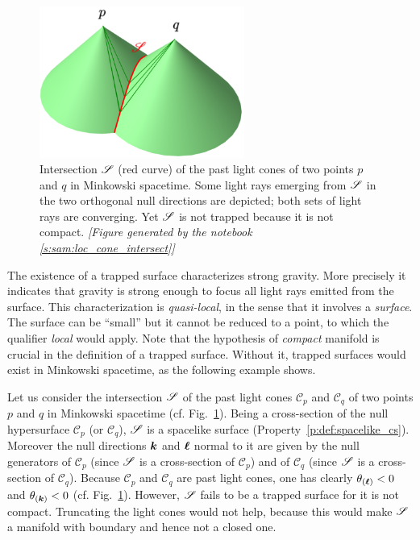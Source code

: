 \begin{figure}
\centerline{\includegraphics[width=0.6\textwidth]{loc_cone_intersect.png}}
\caption[]{\label{f:loc:cone_intersect} \footnotesize
Intersection $\mathscr{S}$ (red curve) of the past light cones of two points $p$ and $q$ in Minkowski spacetime.
Some light rays emerging from $\mathscr{S}$ in the two orthogonal null directions are depicted; both sets
of light rays are converging. Yet $\mathscr{S}$ is not trapped because it is not compact.
\textsl{[Figure generated by the notebook \ref{s:sam:loc_cone_intersect}]}
}
\end{figure}

The existence of a trapped surface characterizes
strong gravity. More precisely it indicates that gravity is strong enough
to focus all light rays emitted from the surface.
This characterization is \emph{quasi-local}, in the sense that it involves a \emph{surface}. The
surface can be ``small'' but it cannot be reduced to a point, to which the qualifier \emph{local}
would apply. Note that the hypothesis of \emph{compact} manifold is crucial in the definition of a
trapped surface. Without it, trapped surfaces would exist in Minkowski
spacetime, as the following example shows.

\begin{example}
Let us consider the intersection $\mathscr{S}$ of the past light cones $\mathscr{C}_p$ and $\mathscr{C}_q$
of two points $p$ and $q$ in Minkowski spacetime (cf. Fig.~\ref{f:loc:cone_intersect}).
Being a cross-section of the null hypersurface $\mathscr{C}_p$ (or $\mathscr{C}_q$),
$\mathscr{S}$ is a spacelike surface (Property~\ref{p:def:spacelike_cs}).
Moreover the null directions $\bm{k}$ and $\bm{\ell}$ normal to it are given by the null generators of
$\mathscr{C}_p$ (since $\mathscr{S}$ is a cross-section of $\mathscr{C}_p$)
and of $\mathscr{C}_q$ (since $\mathscr{S}$ is a cross-section of $\mathscr{C}_q$).
Because $\mathscr{C}_p$ and $\mathscr{C}_q$ are past light cones, one has clearly
$\theta_{(\bm{\ell})} < 0$ and $\theta_{(\bm{k})} < 0$ (cf. Fig.~\ref{f:loc:cone_intersect}).
However, $\mathscr{S}$ fails to be a trapped surface for it is not compact. Truncating the light cones
would not help, because this would make $\mathscr{S}$ a manifold with boundary and hence not a closed one.
\end{example}


